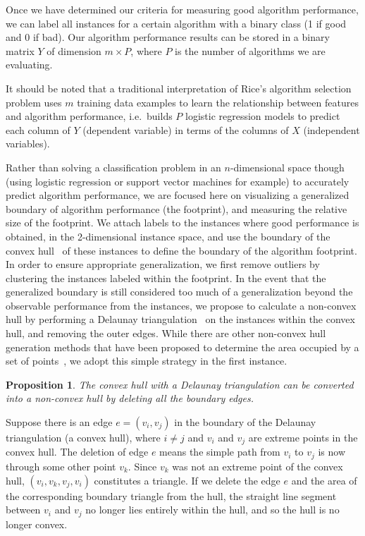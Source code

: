\documentclass[conference]{IEEEtran}
\begin{document}
Once we have determined our criteria for measuring good algorithm performance, we can label all instances for a certain algorithm with a binary class (1 if good and 0 if bad). Our algorithm performance results can be stored in a binary matrix $Y$ of dimension $m \times P$, where $P$ is the number of algorithms we are evaluating.

It should be noted that a traditional interpretation of Rice's algorithm selection problem uses $m$ training data examples to learn the relationship between features and algorithm performance, i.e.~builds $P$ logistic regression models to predict each column of $Y$ (dependent variable) in terms of the columns of $X$ (independent variables).

Rather than solving a classification problem in an $n$-dimensional space though (using logistic regression or support vector machines for example) to accurately predict algorithm performance, we are focused here on visualizing a generalized boundary of algorithm performance (the footprint), and measuring the relative size of the footprint. We attach labels to the instances where good performance is obtained, in the 2-dimensional instance space, and use the boundary of the convex hull~\cite{ConcaveHull, CharacterizationHulls} of these instances to define the boundary of the algorithm footprint. In order to ensure appropriate generalization, we first remove outliers by clustering the instances labeled within the footprint. In the event that the generalized boundary is still considered too much of a generalization beyond the observable performance from the instances, we propose to calculate a non-convex hull by performing a Delaunay triangulation~\cite{Delaunay} on the instances within the convex hull, and removing the outer edges. While there are other non-convex hull generation methods that have been proposed to determine the area occupied by a set of points~\cite{ConcaveHull}, we adopt this simple strategy in the first instance.


\newtheorem*{proposition}{Proposition}
\renewcommand{\IEEEproofindentspace}{0pt}
\renewcommand{\IEEEQED}{\IEEEQEDopen\smallskip}

\begin{proposition}
The convex hull with a Delaunay triangulation can be converted into a non-convex hull by deleting all the boundary edges.
\end{proposition}

\begin{IEEEproof}
Suppose there is an edge $e = (v_i, v_j)$ in the boundary of the Delaunay triangulation (a convex hull), where $i \ne j$ and $v_i$ and $v_j$ are extreme points in the convex hull. The deletion of edge $e$ means the simple path from $v_i$ to $v_j$ is now through some other point $v_k$. Since $v_k$ was not an extreme point of the convex hull, $(v_i, v_k, v_j, v_i)$ constitutes a triangle. If we delete the edge $e$ and the area of the corresponding boundary triangle from the hull, the straight line segment between $v_i$ and $v_j$ no longer lies entirely within the hull, and so the hull is no longer convex.
\end{IEEEproof}
\end{document}
